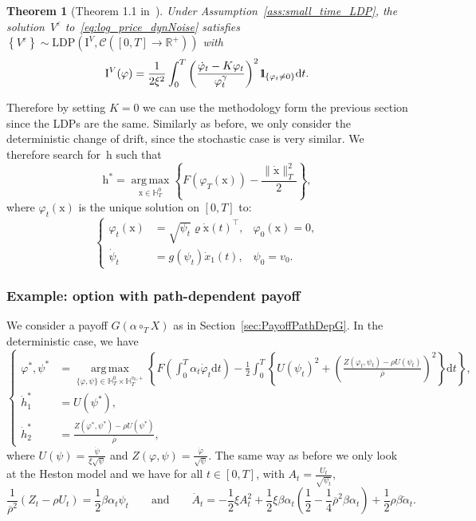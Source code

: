 \documentclass{amsart}[11pt]
\numberwithin{equation}{section}
\newtheorem{theorem}{Theorem}%
\numberwithin{theorem}{subsection}
\numberwithin{proposition}{subsection}
\numberwithin{definition}{subsection}
\numberwithin{lemma}{subsection}
\numberwithin{assumption}{subsection}
\newcommand{\Cc}{\mathcal{C}}
\newcommand{\HH}{\mathbb{H}}
\newcommand{\RR}{\mathbb{R}}
\newcommand{\cT}{\circ_{T}}
\newcommand{\vrho}{\boldsymbol{\mathrm{\varrho}}}
\newcommand{\brho}{\overline{\rho}}
\newcommand{\D}{\mathrm{d}}
\newcommand{\IIV}{\mathrm{I}^{V}}
\newcommand{\LDP}{\mathrm{LDP}}
\newcommand{\eps}{\varepsilon}
\newcommand{\hh}{\boldsymbol{\mathrm{h}}}
\newcommand{\xx}{\boldsymbol{\mathrm{x}}}
\newcommand{\ind}{1\hspace{-2.1mm}{1}} %
\DeclareMathOperator*{\argmax}{arg\,max}
\begin{document}
\begin{theorem}[Theorem 1.1 in~\cite{conforti2015small}]
Under Assumption~\ref{ass:small_time_LDP}, 
the solution~$V^\eps$ to~\eqref{eq:log_price_dynNoise}
satisfies $\left\{V^{\eps}\right\}\sim\LDP(\IIV, \Cc([0, T]\to\RR^{+}))$ with
$$
\IIV(\varphi)=\frac{1}{2 \xi^{2}} \int_{0}^{T}\left(\frac{\dot{\varphi}_{t} - K\varphi_{t}}{\varphi_{t}^{\gamma}}\right)^{2} \ind_{\left\{\varphi_{t} \neq 0\right\}} \D t.
$$
\end{theorem}
Therefore by setting $K=0$ we can use the methodology form the previous section since the LDPs are the same. Similarly as before, we only consider the deterministic change of drift, since the stochastic case is very similar.
We therefore search for~$\hh$ such that
$$
\hh^* = \argmax\limits_{\xx\in \HH_T^0} 
\left\{F(\varphi_T(\xx)) - \frac{\|\dot{\xx}\|_{T}^2}{2}\right\},
$$
where $\varphi_t(\xx)$ is the unique solution on $[0,T]$ to:
\begin{equation*}
\left\{
\begin{array}{rll}
\varphi_t(\xx) & = \displaystyle \sqrt{\psi_t}\vrho \dot{\xx}(t)^\top, & \varphi_0(\xx) = 0,\\
\dot{\psi}_t & =  \displaystyle g(\psi_t) \dot{x}_1(t), & \psi_0 = v_0.
\end{array}
\right.
\end{equation*}

\subsubsection{Example: option with path-dependent payoff}
We consider a payoff $G(\alpha\cT X)$ 
as in Section~\ref{sec:PayoffPathDepG}.
In the deterministic case, we have
\begin{equation*}
\left\{
\begin{array}{rl}
\varphi^{*},\psi^{*}
& = \displaystyle \argmax\limits_{\{\varphi,\psi\} \in \HH_T^0\times \HH_T^{v_0,+}} \left\{F\left(\int_0^T\alpha_t \dot{\varphi}_t \D t\right) - \frac{1}{2}\int_0^T \left\{U(\psi_t)^2 + \left(\frac{Z(\varphi_t,\psi_t) - \rho U(\psi_t)}{\brho}\right)^2\right\}\D t\right\},\\
\dot{h}_1^{*} & = \displaystyle U(\psi^{*}), \\
\dot{h}_2^{*} & = \displaystyle  \frac{Z(\varphi^{*},\psi^{*}) - \rho U(\psi^{*})}{\brho},
\end{array}
\right.
\end{equation*}
where
$U(\psi) = \frac{\dot{\psi}}{\xi \sqrt{\psi}}$
and
$Z(\varphi,\psi) = \frac{\dot{\varphi}}{\sqrt{\psi}}$.
The same way as before we only look at the Heston model and we have for all $t\in[0,T]$,
with $A_t = \frac{U_t}{\sqrt{\psi_t}}$,
$$
\frac{1}{\brho^2}(Z_t - \rho U_t) = \frac{1}{2} \beta \alpha_t \psi_t
\qquad\text{and}\qquad
\dot{A}_t= -\frac{1}{2}\xi A_t^2 + \frac{1}{2}\xi \beta \alpha_t \left(\frac{1}{2} - \frac{1}{4}\brho^2\beta\alpha_t \right) + \frac{1}{2}\rho\beta\dot{\alpha}_t.
$$
\end{document}
